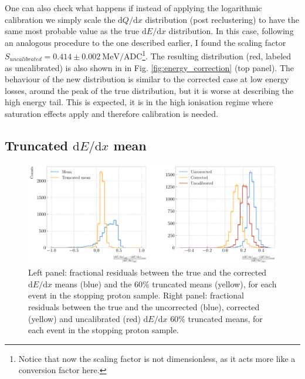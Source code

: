 One can also check what happens if instead of applying the logarithmic calibration we simply scale the $\mathrm{d}Q/\mathrm{d}x$ distribution (post reclustering) to have the same most probable value as the true  $\mathrm{d}E/\mathrm{d}x$ distribution. In this case, following an analogous procedure to the one described earlier, I found the scaling factor $S_{uncalibrated}=0.414\pm0.002~\mathrm{MeV}/\mathrm{ADC}$\footnote{Notice that now the scaling factor is not dimensionless, as it acts more like a conversion factor here.}. The resulting distribution (red, labeled as uncalibrated) is also shown in in Fig. \ref{fig:energy_correction} (top panel). The behaviour of the new distribution is similar to the corrected case at low energy losses, around the peak of the true distribution, but it is worse at describing the high energy tail. This is expected, it is in the high ionisation regime where saturation effects apply and therefore calibration is needed.

\subsection[Truncated \texorpdfstring{$\mathrm{d}E/\mathrm{d}x$}{dE/dx} mean]{Truncated \boldmath\texorpdfstring{$\mathrm{d}E/\mathrm{d}x$}{dE/dx} mean}

\begin{figure}[t]
	\centering
	\includegraphics[width=.90\linewidth]{Images/GArSoft_PID/dEdx/reco_dEdx_truncation_comp.pdf}
	\caption[Fractional residuals between the true and the corrected $\mathrm{d}E/\mathrm{d}x$ means and the $60\%$ truncated means, and fractional residuals between the true and the uncorrected, corrected and uncalibrated $\mathrm{d}E/\mathrm{d}x$ $60\%$ truncated means.]{Left panel: fractional residuals between the true and the corrected $\mathrm{d}E/\mathrm{d}x$ means (blue) and the $60\%$ truncated means (yellow), for each event in the stopping proton sample. Right panel: fractional residuals between the true and the uncorrected (blue), corrected (yellow) and uncalibrated (red) $\mathrm{d}E/\mathrm{d}x$ $60\%$ truncated means, for each event in the stopping proton sample.}
	\label{fig:energy_trucation_comp}
\end{figure}

